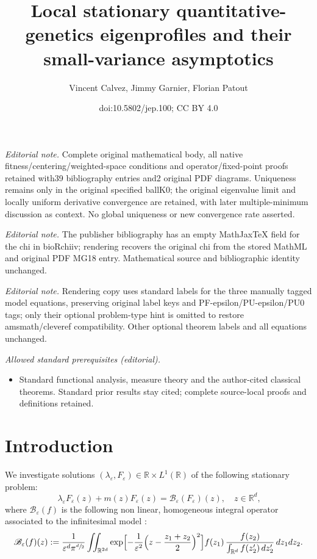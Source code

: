 \documentclass[10pt]{amsart}
\title{Local stationary quantitative-genetics eigenprofiles and their small-variance asymptotics}
\author{Vincent Calvez, Jimmy Garnier, Florian Patout}
\date{doi:10.5802/jep.100; CC BY 4.0}
\let\mathcal\mathscr
\newcommand{\cB}{\mathcal{B}}
\theoremstyle{plain}
\theoremstyle{definition}
\newcommand{\RR}{\mathbb{R}}\let\R\RR
\let\eps\varepsilon
\begin{document}
\maketitle
\noindent\textit{Editorial note.} Complete original mathematical body, all native fitness/centering/weighted-space conditions and operator/fixed-point proofs retained with39 bibliography entries and2 original PDF diagrams. Uniqueness remains only in the original specified ballK0; the original eigenvalue limit and locally uniform derivative convergence are retained, with later multiple-minimum discussion as context. No global uniqueness or new convergence rate asserted.\par\medskip
\noindent\textit{Editorial note.} The publisher bibliography has an empty MathJaxTeX field for the chi in bioRchiiv; rendering recovers the original chi from the stored MathML and original PDF MG18 entry. Mathematical source and bibliographic identity unchanged.\par\medskip
\noindent\textit{Editorial note.} Rendering copy uses standard labels for the three manually tagged model equations, preserving original label keys and PF-epsilon/PU-epsilon/PU0 tags; only their optional problem-type hint is omitted to restore amsmath/cleveref compatibility. Other optional theorem labels and all equations unchanged.\par\medskip
\noindent\textit{Allowed standard prerequisites (editorial).}\begin{itemize}
\item Standard functional analysis, measure theory and the author-cited classical theorems. Standard prior results stay cited; complete source-local proofs and definitions retained.
\end{itemize}\medskip
\tableofcontents


\vspace*{-\baselineskip}\vskip0pt
\section{Introduction}
We investigate solutions $(\lambda_\eps,F_\eps) \in \R\times L^1(\R)$ of the following stationary problem:
\begin{equation}\label{eq:main_fep}\tag{$PF_\eps$}
\ \lambda_\eps F_\eps(z) + m(z) F_\eps(z) = \cB_\eps (F_\eps)(z), \quad z\in \R^d ,
\end{equation}
where $\cB_\eps (f)$ is the following non linear, homogeneous integral operator associated to the infinitesimal model \cite{Fisher1918,weberinfinitesimal}:
\begin{equation}
\cB_\eps (f)(z):= \dfrac{1}{\eps^d \pi^{\sfrac d2}} \iint_{\RR^{2d}} \exp\Bigl[ - \dfrac{1}{\eps^2} \Bigl(z - \dfrac{z_1 + z_2}2 \Bigr)^2 \Bigr ] f(z_1)\,\dfrac{f(z_2)}{ \int_{\R^d} f(z_2')\, d z_2'}\, d z_1 d z_2.\label{eq:Beps}
\end{equation}
\end{document}
